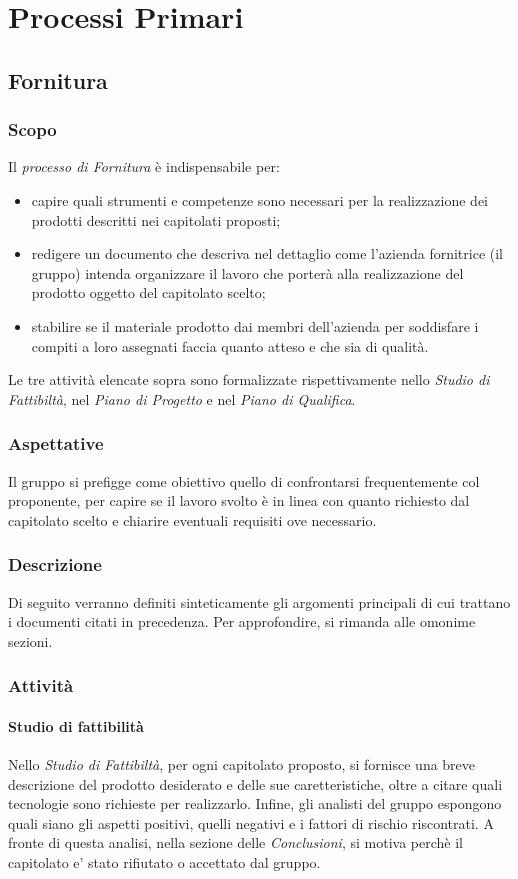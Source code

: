 \section{Processi Primari} 


\subsection{Fornitura}

	\subsubsection{Scopo}
	\text Il \textit{processo di Fornitura} è indispensabile per:
	\begin{itemize}
	\item capire quali strumenti e competenze sono necessari per la realizzazione dei prodotti descritti nei capitolati proposti;
	\item redigere un documento che descriva nel dettaglio come l'azienda fornitrice (il gruppo) intenda organizzare il lavoro che porterà alla realizzazione del prodotto oggetto del capitolato scelto;
	\item stabilire se il materiale prodotto dai membri dell'azienda per soddisfare i compiti a loro assegnati faccia quanto atteso e che sia di qualità.    
	\end{itemize}
Le tre attività elencate sopra sono formalizzate rispettivamente nello \textit{Studio di Fattibiltà}, nel \textit{Piano di Progetto} e nel \textit{Piano di Qualifica}.
 	\subsubsection{Aspettative}
Il gruppo si prefigge come obiettivo quello di confrontarsi frequentemente col proponente, per capire se il lavoro svolto è in linea con quanto richiesto dal capitolato scelto e chiarire eventuali requisiti ove necessario.
	\subsubsection{Descrizione}
	Di seguito verranno definiti sinteticamente gli argomenti principali di cui trattano i documenti citati in precedenza. Per approfondire, si rimanda alle omonime sezioni. 
	\subsubsection{Attività}

		\paragraph{Studio di fattibilità}
		Nello \textit{Studio di Fattibiltà}, per ogni capitolato proposto, si fornisce una breve descrizione del prodotto desiderato e delle sue caretteristiche, oltre a citare quali tecnologie sono richieste per realizzarlo. Infine, gli analisti del gruppo espongono quali siano gli aspetti positivi, quelli negativi e i fattori di rischio riscontrati. A fronte di questa analisi, nella sezione delle \textit{Conclusioni}, si motiva perchè il capitolato e' stato rifiutato o accettato dal gruppo.  
